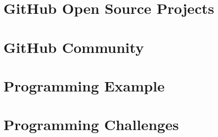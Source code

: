 \section[Open Source]{GitHub Open Source Projects}



\section[GitHub Community]{GitHub Community}


\section[Example]{Programming Example}


\section[Challenges]{Programming Challenges}


\frame{
    \frametitle{\large{}}
    \huge{\center{\color{RUBblau}{Thank you for your attention.}}}
}


